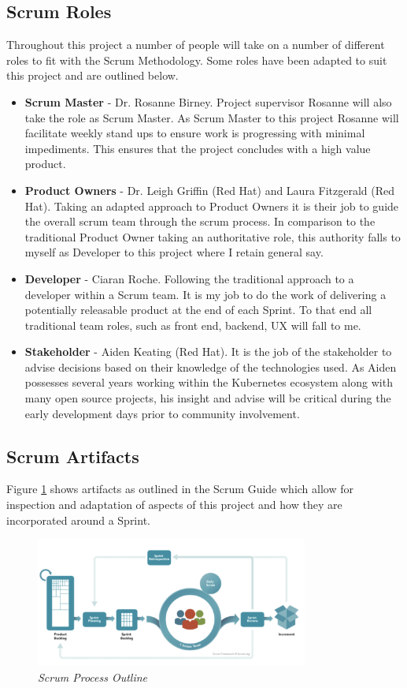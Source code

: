 \newpage
\subsection{Scrum Roles}
Throughout this project a number of people will take on a number of different roles to fit with the Scrum Methodology. Some roles have been adapted to suit this project and are outlined below.
\begin{itemize}
    \item \textbf{Scrum Master} - Dr. Rosanne Birney. Project supervisor Rosanne will also take the role as Scrum Master. As Scrum Master to this project Rosanne will facilitate weekly stand ups to ensure work is progressing with minimal impediments. This ensures that the project concludes with a high value product.
    \item \textbf{Product Owners} - Dr. Leigh Griffin (Red Hat) and Laura Fitzgerald (Red Hat). Taking an adapted approach to Product Owners it is their job to guide the overall scrum team through the scrum process. In comparison to the traditional Product Owner taking an authoritative role, this authority falls to myself as Developer to this project where I retain general say.
    \item \textbf{Developer} - Ciaran Roche. Following the traditional approach to a developer within a Scrum team. It is my job to do the work of delivering a potentially releasable product at the end of each Sprint. To that end all traditional team roles, such as front end, backend, UX will fall to me.
    \item \textbf{Stakeholder} - Aiden Keating (Red Hat). It is the job of the stakeholder to advise decisions based on their knowledge of the technologies used. As Aiden possesses several years working within the Kubernetes ecosystem along with many open source projects, his insight and advise will be critical during the early development days prior to community involvement.
\end{itemize}

\subsection{Scrum Artifacts}
\label{sub:sart}
Figure \ref{img:scrum} shows artifacts as outlined in the Scrum Guide \citep{scrum} which allow for inspection and adaptation of aspects of this project and how they are incorporated around a Sprint.
\begin{figure}[!ht]
\centering
\includegraphics*[width=0.8\textwidth]{images/scrum-process.png}
\caption{\em Scrum Process Outline \cite{scrumguide}}
\label{img:scrum}
\end{figure}

